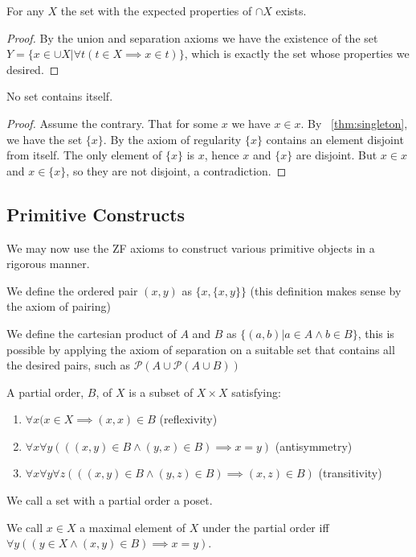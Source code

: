 \documentclass[]{article}
\begin{document}
\begin{thm} \label{thm:intersection}
		For any $X$ the set with the expected properties of $\cap X$ exists.
\end{thm}

\begin{proof}
		By the union and separation axioms we have the existence of the set $Y = \{x \in \cup X | \forall t(t \in X \implies x \in t)\}$, which is exactly the set whose properties we desired.
\end{proof}

\begin{thm} \label{thm:noselfcontain}
	No set contains itself.
\end{thm}

\begin{proof}
		Assume the contrary. That for some $x$ we have $x \in x$. By ~\ref{thm:singleton}, we have the set $\{x\}$. By the axiom of regularity $\{x\}$ contains an element disjoint from itself. The only element of $\{x\}$ is $x$, hence $x$ and $\{x\}$ are disjoint. But $x \in x$ and $x \in \{x\}$, so they are not disjoint, a contradiction.
\end{proof}

\subsection{Primitive Constructs}

We may now use the ZF axioms to construct various primitive objects in a rigorous manner.

\begin{defi} 
		We define the ordered pair $(x, y)$ as $\{x, \{x, y\}\}$ (this definition makes sense by the axiom of pairing)	
\end{defi}

\begin{defi} 
		We define the cartesian product of $A$ and $B$ as $\{(a, b) | a \in A \land b \in B\}$, this is possible by applying the axiom of separation on a suitable set that contains all the desired pairs, such as $\mathcal{P}(A \cup \mathcal{P}(A \cup B))$
\end{defi}

\begin{defi} 
	A partial order, $B$, of $X$ is a subset of $X \times X$ satisfying:
	\begin{enumerate}
			\item $\forall x(x \in X \implies (x,x) \in B$ (reflexivity)
			\item $\forall x \forall y(((x,y) \in B \land (y,x) \in B) \implies x = y)$ (antisymmetry)
			\item $\forall x \forall y \forall z(((x,y) \in B \land (y,z) \in B) \implies (x,z) \in B)$ (transitivity)
	\end{enumerate}

	We call a set with a partial order a poset.

	We call $x \in X$ a maximal element of $X$ under the partial order iff $\forall y((y \in X \land (x,y) \in B) \implies x = y)$.
\end{defi}
\end{document}

